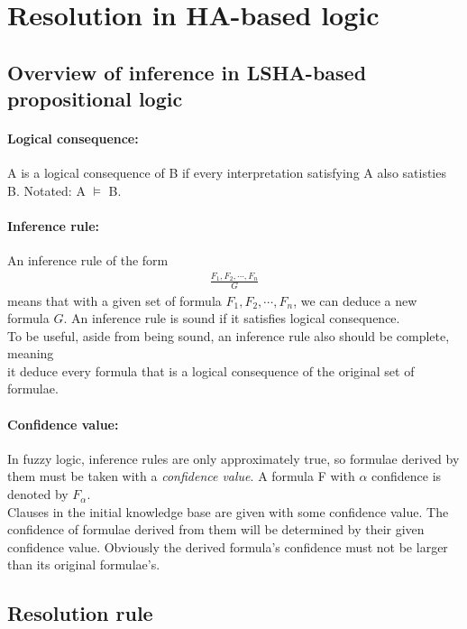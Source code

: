 \documentclass[part1.tex]{subfiles}
\begin{document}
\section{Resolution in HA-based logic}
\subsection{Overview of inference in LSHA-based propositional logic}
\paragraph{Logical consequence:} A is a logical consequence of B if every interpretation 
satisfying A also satisties B. Notated: A \(\models\) B.\\
\paragraph{Inference rule:} An inference rule of the form\\
\begin{align*}
	\frac{F_1, F_2,\cdots,F_n}{G}
\end{align*}
means that with a given set of formula \(F_1,F_2,\cdots,F_n\), we can deduce a 
new formula \(G\). An inference rule is sound if it satisfies logical consequence.\\
To be useful, aside from being sound, an inference rule also should be complete, meaning\\
it deduce every formula that is a logical consequence of the original set of formulae.\\
\paragraph{Confidence value:}
In fuzzy logic, inference rules are only approximately true, so formulae derived by them must be
taken with a {\em confidence value}. A formula F with \(\alpha\) confidence is denoted by \(F_\alpha\).\\

Clauses in the initial knowledge base are given with some confidence value. The confidence of formulae
derived from them will be determined by their given confidence value. Obviously the derived formula's 
confidence must not be larger than its original formulae's.

\subsection{Resolution rule}
\end{document}
